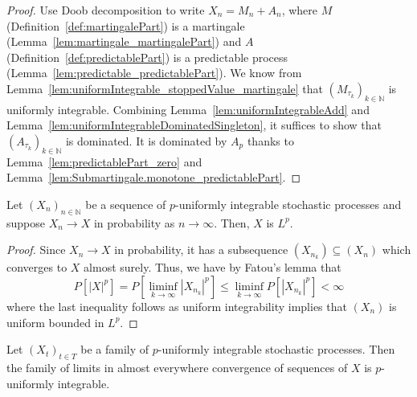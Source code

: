 \begin{proof}
Use Doob decomposition to write $X_n = M_n + A_n$, where $M$ (Definition~\ref{def:martingalePart}) is a martingale (Lemma~\ref{lem:martingale_martingalePart}) and $A$ (Definition~\ref{def:predictablePart}) is a predictable process (Lemma~\ref{lem:predictable_predictablePart}).
We know from Lemma~\ref{lem:uniformIntegrable_stoppedValue_martingale} that $(M_{\tau_k})_{k \in \mathbb{N}}$ is uniformly integrable. Combining Lemma~\ref{lem:uniformIntegrableAdd} and Lemma~\ref{lem:uniformIntegrableDominatedSingleton}, it suffices to show that $(A_{\tau_k})_{k \in \mathbb{N}}$ is dominated. It is dominated by $A_p$ thanks to Lemma~\ref{lem:predictablePart_zero} and Lemma~\ref{lem:Submartingale.monotone_predictablePart}.
\end{proof}

\begin{lemma}\label{lem:memLp_of_tendstoInMeasure}
  \leanok
  Let $(X_n)_{n \in \mathbb{N}}$ be a sequence of $p$-uniformly integrable stochastic processes and suppose $X_n \to X$
  in probability as $n \to \infty$. Then, $X$ is $L^p$.
\end{lemma}

\begin{proof}
  \leanok
  Since $X_n \to X$ in probability, it has a subsequence $(X_{n_k}) \subseteq (X_n)$ which converges
  to $X$ almost surely. Thus, we have by Fatou's lemma that
  \[P[|X|^p] = P[\liminf_{k \to \infty} |X_{n_k}|^p] \le \liminf_{k \to \infty} P[|X_{n_k}|^p] < \infty\]
  where the last inequality follows as uniform integrability implies that $(X_n)$ is uniform bounded in $L^p$.
\end{proof}

\begin{lemma}\label{lem:uniformIntegrable_of_tendsto_ae}
  \leanok
  Let $(X_t)_{t \in T}$ be a family of $p$-uniformly integrable stochastic processes. Then the family of limits in almost everywhere convergence of sequences of $X$ is $p$-uniformly integrable.
\end{lemma}

